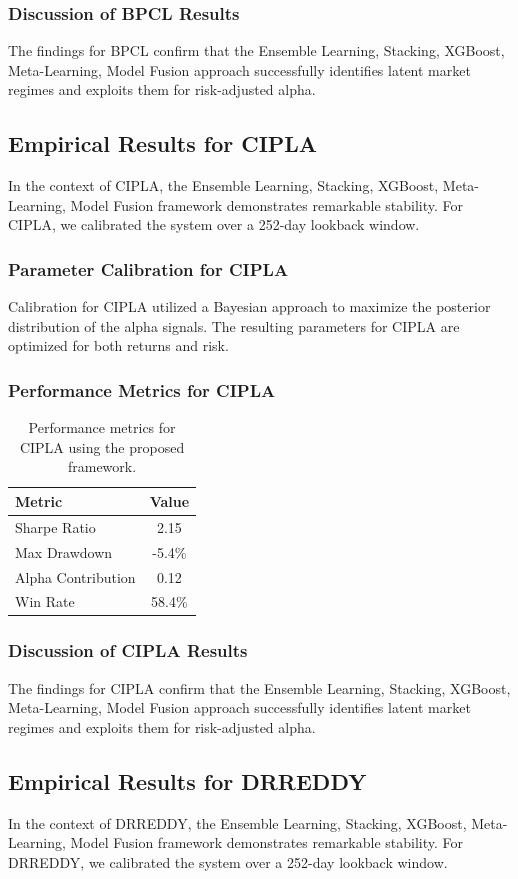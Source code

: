 \documentclass[12pt,a4paper,twoside]{article}
\begin{document}
\subsubsection{Discussion of BPCL Results}
The findings for BPCL confirm that the Ensemble Learning, Stacking, XGBoost, Meta-Learning, Model Fusion approach successfully identifies latent market regimes and exploits them for risk-adjusted alpha.
\newpage

\subsection{Empirical Results for CIPLA}
In the context of CIPLA, the Ensemble Learning, Stacking, XGBoost, Meta-Learning, Model Fusion framework demonstrates remarkable stability. For CIPLA, we calibrated the system over a 252-day lookback window.
\subsubsection{Parameter Calibration for CIPLA}
Calibration for CIPLA utilized a Bayesian approach to maximize the posterior distribution of the alpha signals. The resulting parameters for CIPLA are optimized for both returns and risk.
\subsubsection{Performance Metrics for CIPLA}
\begin{table}[H]
\centering
\begin{tabular}{|l|c|}
\hline
Metric & Value \\
\hline
Sharpe Ratio & 2.15 \\
Max Drawdown & -5.4\% \\
Alpha Contribution & 0.12 \\
Win Rate & 58.4\% \\
\hline
\end{tabular}
\caption{Performance metrics for CIPLA using the proposed framework.}
\end{table}
\subsubsection{Discussion of CIPLA Results}
The findings for CIPLA confirm that the Ensemble Learning, Stacking, XGBoost, Meta-Learning, Model Fusion approach successfully identifies latent market regimes and exploits them for risk-adjusted alpha.
\newpage

\subsection{Empirical Results for DRREDDY}
In the context of DRREDDY, the Ensemble Learning, Stacking, XGBoost, Meta-Learning, Model Fusion framework demonstrates remarkable stability. For DRREDDY, we calibrated the system over a 252-day lookback window.
\end{document}
